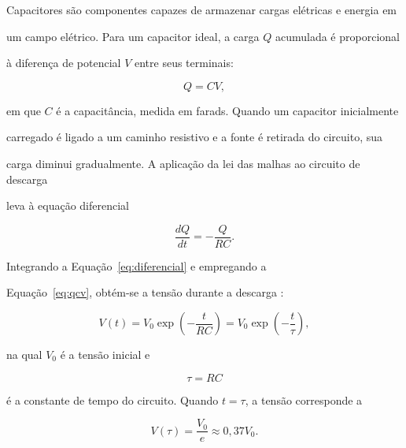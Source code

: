 \documentclass[a4paper,12pt]{article}
\begin{document}
Capacitores são componentes capazes de armazenar cargas elétricas e energia em

um campo elétrico. Para um capacitor ideal, a carga $Q$ acumulada é proporcional

à diferença de potencial $V$ entre seus terminais:

\begin{equation}

  Q=CV,

  \label{eq:qcv}

\end{equation}

em que $C$ é a capacitância, medida em farads. Quando um capacitor inicialmente

carregado é ligado a um caminho resistivo e a fonte é retirada do circuito, sua

carga diminui gradualmente. A aplicação da lei das malhas ao circuito de descarga

leva à equação diferencial

\begin{equation}

  \frac{dQ}{dt}=-\frac{Q}{RC}.

  \label{eq:diferencial}

\end{equation}

Integrando a Equação~\eqref{eq:diferencial} e empregando a

Equação~\eqref{eq:qcv}, obtém-se a tensão durante a descarga
\parencite{halliday,ling2016,mit_rc2007,roteiro}:

\begin{equation}

  V(t)=V_0\exp\left(-\frac{t}{RC}\right)

      =V_0\exp\left(-\frac{t}{\tau}\right),

  \label{eq:descarga}

\end{equation}

na qual $V_0$ é a tensão inicial e

\begin{equation}

  \tau=RC

  \label{eq:tau}

\end{equation}

é a constante de tempo do circuito. Quando $t=\tau$, a tensão corresponde a

\begin{equation}

  V(\tau)=\frac{V_0}{e}\approx0{,}37V_0.

  \label{eq:v_tau}

\end{equation}
\end{document}

